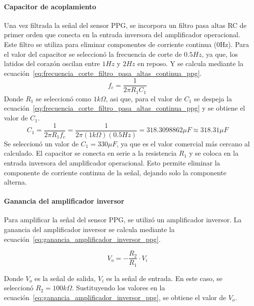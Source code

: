         \paragraph{Capacitor de acoplamiento}
        Una vez filtrada la señal del sensor PPG, se incorpora un filtro pasa altas RC de primer orden que conecta en la entrada inversora del amplificador operacional. Este filtro se utiliza para eliminar componentes de corriente continua (0Hz). Para el valor del capacitor se seleccionó la frecuencia de corte de $0.5 Hz$, ya que, los latidos del corazón oscilan entre $1 Hz$ y $2 Hz$ en reposo. Y se calcula mediante la ecuación~\ref{eq:frecuencia_corte_filtro_pasa_altas_continua_ppg}.
        \begin{equation}
            \label{eq:frecuencia_corte_filtro_pasa_altas_continua_ppg}
            f_c = \frac{1}{2\pi R_1 C_1}
        \end{equation}
        Donde $R_1$ se seleccionó como $1k\Omega$, asi que, para el valor de $C_1$ se despeja la ecuación~\ref{eq:frecuencia_corte_filtro_pasa_altas_continua_ppg} y se obtiene el valor de $C_1$.
        \begin{equation}
            C_1 = \frac{1}{2\pi R_1 f_c} = \frac{1}{2\pi (1k\Omega)(0.5Hz)} = 318.3098862 \mu F \approx 318.31 \mu F
        \end{equation}
        Se seleccionó un valor de $C_1 = 330 \mu F$, ya que es el valor comercial más cercano al calculado. El capacitor se conecta en serie a la resistencia $R_1$ y se coloca en la entrada inversora del amplificador operacional. Esto permite eliminar la componente de corriente continua de la señal, dejando solo la componente alterna.

        \paragraph{Ganancia del amplificador inversor}
        Para amplificar la señal del sensor PPG, se utilizó un amplificador inversor. La ganancia del amplificador inversor se calcula mediante la ecuación~\ref{eq:ganancia_amplificador_inversor_ppg}.

        \begin{equation}
            \label{eq:ganancia_amplificador_inversor_ppg}
            V_o = - \frac{R_2}{R_1} \cdot V_i
        \end{equation}

        Donde $V_o$ es la señal de salida, $V_i$ es la señal de entrada. En este caso, se seleccionó $R_2 = 100 k\Omega$. Sustituyendo los valores en la ecuación~\ref{eq:ganancia_amplificador_inversor_ppg}, se obtiene el valor de $V_o$.

